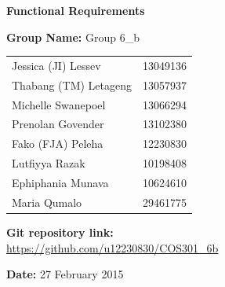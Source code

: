 \documentclass[a4paper,11pt]{article}
\begin{document}
\begin{center}

\Huge\textbf{Functional Requirements\\}
																											
\vspace{2 cm}

\LARGE\textbf{Group Name:} Group 6\_b\newline
 
\vspace{0.5 cm}
\begin{tabular}{lr}
Jessica (JI) Lessev&13049136\\
Thabang (TM) Letageng&13057937\\
Michelle Swanepoel&13066294\\
Prenolan Govender&13102380\\
Fako (FJA) Peleha&12230830\\
Lutfiyya Razak&10198408\\
Ephiphania Munava&10624610\\
Maria Qumalo&29461775\\
\end{tabular}

\vspace{1cm}
\textbf{Git repository link:\\}
\url{https://github.com/u12230830/COS301\_6b}

\vspace{1cm}
\textbf{Date:} 27 February 2015
\end{center}


\newpage
\end{document}
